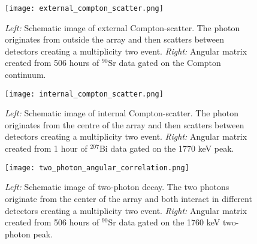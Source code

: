 \documentclass[cnatzke_thesis_proposal.tex]{subfiles}
\begin{document}
\begin{figure}[htbp]
  \centering
  \texttt{[image: external\_compton\_scatter.png]}
  \caption{
    \textit{Left:} Schematic image of external Compton-scatter. The photon originates from outside the array and then scatters between detectors creating a multiplicity two event. 
    \textit{Right:} Angular matrix created from 506 hours of $^{90}$Sr data gated on the Compton continuum. 
  }
  \label{fig:external_compton_scatter_schematic}
\end{figure}
\begin{figure}[htbp]
  \centering
  \texttt{[image: internal\_compton\_scatter.png]}
  \caption{
    \textit{Left:} Schematic image of internal Compton-scatter. The photon originates from the centre of the array and then scatters between detectors creating a multiplicity two event. 
    \textit{Right:} Angular matrix created from 1 hour of $^{207}$Bi data gated on the 1770 keV peak.
  }
  \label{fig:internal_compton_scatter_schematic}
\end{figure}
\begin{figure}[htbp]
  \centering
  \texttt{[image: two\_photon\_angular\_correlation.png]}
  \caption{
    \textit{Left:} Schematic image of two-photon decay. The two photons originate from the center of the array and both interact in different detectors creating a multiplicity two event. 
    \textit{Right:} Angular matrix created from 506 hours of $^{90}$Sr data gated on the 1760 keV two-photon peak.
  }
  \label{fig:two_photon_angular_schematic}
\end{figure}


\end{document}
